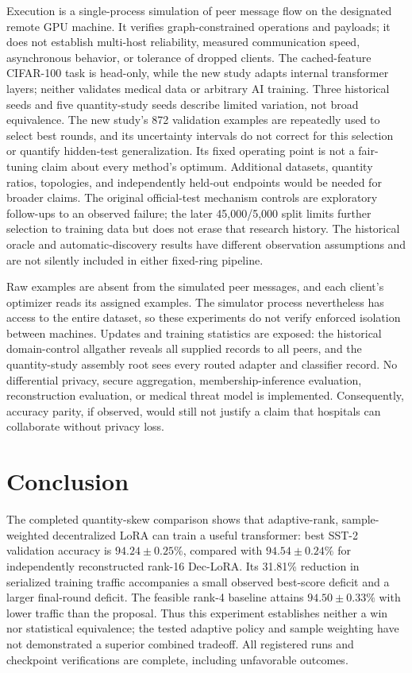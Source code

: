 \documentclass[11pt]{article}
\begin{document}
Execution is a single-process simulation of peer message flow on the designated remote GPU machine. It verifies graph-constrained operations and payloads; it does not establish multi-host reliability, measured communication speed, asynchronous behavior, or tolerance of dropped clients. The cached-feature CIFAR-100 task is head-only, while the new study adapts internal transformer layers; neither validates medical data or arbitrary AI training. Three historical seeds and five quantity-study seeds describe limited variation, not broad equivalence. The new study's 872 validation examples are repeatedly used to select best rounds, and its uncertainty intervals do not correct for this selection or quantify hidden-test generalization. Its fixed operating point is not a fair-tuning claim about every method's optimum. Additional datasets, quantity ratios, topologies, and independently held-out endpoints would be needed for broader claims. The original official-test mechanism controls are exploratory follow-ups to an observed failure; the later 45,000/5,000 split limits further selection to training data but does not erase that research history. The historical oracle and automatic-discovery results have different observation assumptions and are not silently included in either fixed-ring pipeline.

Raw examples are absent from the simulated peer messages, and each client's optimizer reads its assigned examples. The simulator process nevertheless has access to the entire dataset, so these experiments do not verify enforced isolation between machines. Updates and training statistics are exposed: the historical domain-control allgather reveals all supplied records to all peers, and the quantity-study assembly root sees every routed adapter and classifier record. No differential privacy, secure aggregation, membership-inference evaluation, reconstruction evaluation, or medical threat model is implemented. Consequently, accuracy parity, if observed, would still not justify a claim that hospitals can collaborate without privacy loss.

\section{Conclusion}
The completed quantity-skew comparison shows that adaptive-rank, sample-weighted decentralized LoRA can train a useful transformer: best SST-2 validation accuracy is $94.24\pm0.25\%$, compared with $94.54\pm0.24\%$ for independently reconstructed rank-16 Dec-LoRA. Its 31.81\% reduction in serialized training traffic accompanies a small observed best-score deficit and a larger final-round deficit. The feasible rank-4 baseline attains $94.50\pm0.33\%$ with lower traffic than the proposal. Thus this experiment establishes neither a win nor statistical equivalence; the tested adaptive policy and sample weighting have not demonstrated a superior combined tradeoff. All registered runs and checkpoint verifications are complete, including unfavorable outcomes.
\end{document}

